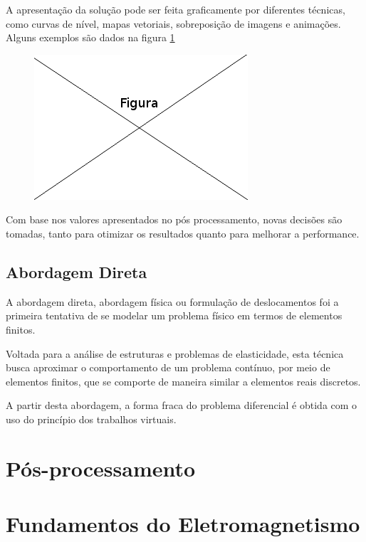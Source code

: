 \documentclass[
    12pt,               %
    openright,          %
    oneside,
    a4paper,            %
    english,            %
    french,             %
    spanish,            %
    brazil              %
    ]{abntex2}
\begin{document}
A apresentação da solução pode ser feita graficamente por diferentes técnicas, como curvas de nível, mapas vetoriais, sobreposição de imagens e animações. Alguns exemplos são dados na figura \ref{fig:graf}

\begin{figure}[!htb]
\centering
\includegraphics[scale=0.5]{figuras/temp.png}
\caption{}
\label{fig:graf}
\end{figure}

Com base nos valores apresentados no pós processamento, novas decisões são tomadas, tanto para otimizar os resultados quanto para melhorar a performance.

\subsection{Abordagem Direta \\}

A abordagem direta, abordagem física ou formulação de deslocamentos foi a primeira tentativa de se modelar um problema físico em termos de elementos finitos.

Voltada para a análise de estruturas e problemas de elasticidade, esta técnica busca aproximar o comportamento de um problema contínuo, por meio de elementos finitos, que se comporte de maneira similar a elementos reais discretos.
\cite[p. 19]{zien}

A partir desta abordagem, a forma fraca do problema diferencial é obtida com o uso do princípio dos trabalhos virtuais.
\cite[p. 20]{zien}

 
\section{Pós-processamento}
\label{sec:posProc}

\section{Fundamentos do Eletromagnetismo}
\label{sec:eletromag}
\end{document}
